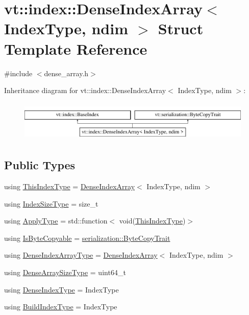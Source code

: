 \hypertarget{structvt_1_1index_1_1_dense_index_array}{}\section{vt\+:\+:index\+:\+:Dense\+Index\+Array$<$ Index\+Type, ndim $>$ Struct Template Reference}
\label{structvt_1_1index_1_1_dense_index_array}


{\ttfamily \#include $<$dense\+\_\+array.\+h$>$}

Inheritance diagram for vt\+:\+:index\+:\+:Dense\+Index\+Array$<$ Index\+Type, ndim $>$\+:\begin{figure}[H]
\begin{center}
\leavevmode
\includegraphics[height=1.944445cm]{structvt_1_1index_1_1_dense_index_array}
\end{center}
\end{figure}
\subsection*{Public Types}
\begin{DoxyCompactItemize}
\item 
using \hyperlink{structvt_1_1index_1_1_dense_index_array_a6915511f6a82dff2522d6e8c2be20f2a}{This\+Index\+Type} = \hyperlink{structvt_1_1index_1_1_dense_index_array}{Dense\+Index\+Array}$<$ Index\+Type, ndim $>$
\item 
using \hyperlink{structvt_1_1index_1_1_dense_index_array_ae2999552165f16fc69a2940e0589819f}{Index\+Size\+Type} = size\+\_\+t
\item 
using \hyperlink{structvt_1_1index_1_1_dense_index_array_ab44b9e5a65d28520268523fbe99f6a9d}{Apply\+Type} = std\+::function$<$ void(\hyperlink{structvt_1_1index_1_1_dense_index_array_a6915511f6a82dff2522d6e8c2be20f2a}{This\+Index\+Type})$>$
\item 
using \hyperlink{structvt_1_1index_1_1_dense_index_array_a0d13f3168c5d8b4b3abc6cb083d34bc3}{Is\+Byte\+Copyable} = \hyperlink{structvt_1_1serialization_1_1_byte_copy_trait}{serialization\+::\+Byte\+Copy\+Trait}
\item 
using \hyperlink{structvt_1_1index_1_1_dense_index_array_aec95c4ed1b4071d31d24142f02429dbd}{Dense\+Index\+Array\+Type} = \hyperlink{structvt_1_1index_1_1_dense_index_array}{Dense\+Index\+Array}$<$ Index\+Type, ndim $>$
\item 
using \hyperlink{structvt_1_1index_1_1_dense_index_array_a7a66b5cd270377310119da3d0c884224}{Dense\+Array\+Size\+Type} = uint64\+\_\+t
\item 
using \hyperlink{structvt_1_1index_1_1_dense_index_array_a36698427e28045290d1fb072573275ec}{Dense\+Index\+Type} = Index\+Type
\item 
using \hyperlink{structvt_1_1index_1_1_dense_index_array_a84d2aa360d257c9b1d7e324088c7763b}{Build\+Index\+Type} = Index\+Type
\end{DoxyCompactItemize}
